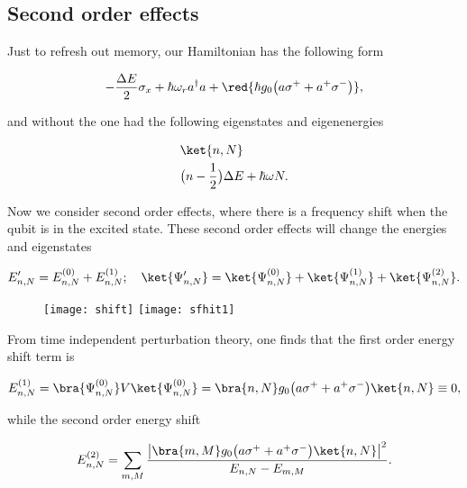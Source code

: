 \subsection{Second order effects}
Just to  refresh out memory,  our Hamiltonian
has the following form

\begin{equation}\label{sec}
  -\frac{\Delta E}{2}\sigma_x + \hbar\omega_ra^{\dagger}a + \red{\hbar g_0\big(a\sigma^{+}+a^{+}\sigma^{-}\big)},
\end{equation}

\noindent  and  without the   one had the following eigenstates and
eigenenergies

\begin{equation}\label{secStates}
  \begin{aligned}
    &\ket{n,N}\\
    &\big(n-\frac{1}{2}\big)\Delta E + \hbar\omega
    N.
  \end{aligned}
\end{equation}

\noindent  Now   we  consider   second  order
effects,  where there  is  a frequency  shift
when  the  qubit  is in  the  excited  state.
These  second order  effects will  change the
energies and eigenstates

\begin{equation}\label{secEi}
  E'_{n,N} = E_{n,N}^{(0)} + E_{n,N}^{(1)};\quad \ket{\Psi'_{n,N}}=\ket{\Psi^{(0)}_{n,N}}+\ket{\Psi^{(1)}_{n,N}}+\ket{\Psi^{(2)}_{n,N}}.
\end{equation}


\begin{figure}[h]
  \centering%
  \texttt{[image: shift]}
  \texttt{[image: sfhit1]}
\end{figure}

\noindent From  time independent perturbation
theory, one finds that the first order energy
shift term is

\begin{equation}\label{sec1st}
  E_{n,N}^{(1)} = \bra{\Psi^{(0)}_{n,N}}V\ket{\Psi^{(0)}_{n,N}} = \bra{n,N}g_0\big(a\sigma^{+}+a^{+}\sigma^{-}\big)\ket{n,N} \equiv 0,
\end{equation}

\noindent while the second order energy shift

\begin{equation}\label{sec2nd}
  E_{n,N}^{(2)} = \sum_{m,M}\frac{\left|\bra{m,M}g_0\big(a\sigma^{+}+a^{+}\sigma^{-}\big)\ket{n,N}\right|^2}{E_{n,N}-E_{m,M}}.
\end{equation}

